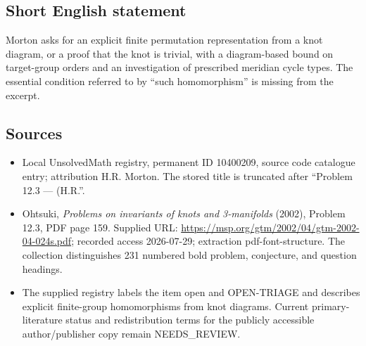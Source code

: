 \documentclass[11pt]{article}
\begin{document}
\subsection{Short English statement}
Morton asks for an explicit finite permutation representation from a knot diagram, or a proof that the knot is trivial, with a diagram-based bound on target-group orders and an investigation of prescribed meridian cycle types. The essential condition referred to by ``such homomorphism'' is missing from the excerpt.
\subsection{Sources}
\begin{itemize}
\item Local UnsolvedMath registry, permanent ID 10400209, source code catalogue entry; attribution H.R. Morton. The stored title is truncated after ``Problem 12.3 --- (H.R.''.
\item Ohtsuki, \emph{Problems on invariants of knots and 3-manifolds} (2002), Problem 12.3, PDF page 159. Supplied URL: \url{https://msp.org/gtm/2002/04/gtm-2002-04-024s.pdf}; recorded access 2026-07-29; extraction pdf-font-structure. The collection distinguishes 231 numbered bold problem, conjecture, and question headings.
\item The supplied registry labels the item open and OPEN-TRIAGE and describes explicit finite-group homomorphisms from knot diagrams. Current primary-literature status and redistribution terms for the publicly accessible author/publisher copy remain NEEDS\_REVIEW.
\end{itemize}
\end{document}
